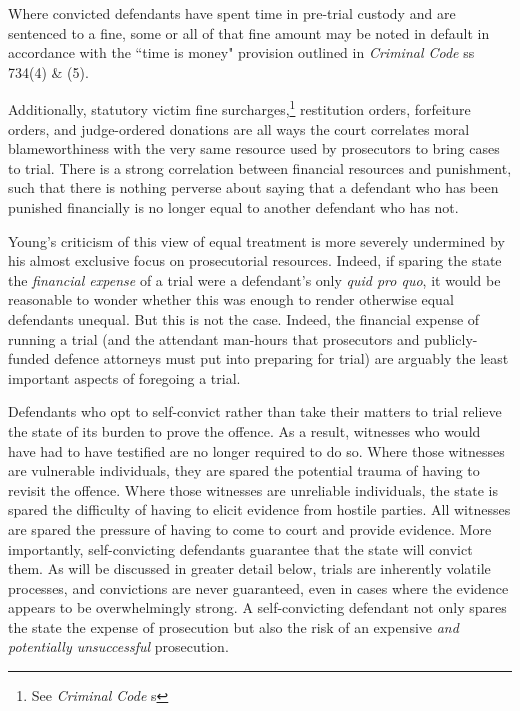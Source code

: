 Where convicted defendants have spent time in pre-trial custody and are sentenced to a fine, some or all of that fine amount may be noted in default in accordance with the ``time is money" provision outlined in \textit{Criminal Code} ss 734(4) \& (5).

Additionally, statutory victim fine surcharges,\footnote{See \textit{Criminal Code} s } restitution orders, forfeiture orders, and judge-ordered donations are all ways the court correlates moral blameworthiness with the very same resource used by prosecutors to bring cases to trial. There is a strong correlation between financial resources and punishment, such that there is nothing perverse about saying that a defendant who has been punished financially is no longer equal to another defendant who has not.

Young's criticism of this view of equal treatment is more severely undermined by his almost exclusive focus on prosecutorial resources. Indeed, if sparing the state the \textit{financial expense} of a trial were a defendant's only \textit{quid pro quo}, it would be reasonable to wonder whether this was enough to render otherwise equal defendants unequal. But this is not the case. Indeed, the financial expense of running a trial (and the attendant man-hours that prosecutors and publicly-funded defence attorneys must put into preparing for trial) are arguably the least important aspects of foregoing a trial. 

Defendants who opt to self-convict rather than take their matters to trial relieve the state of its burden to prove the offence. As a result, witnesses who would have had to have testified are no longer required to do so. Where those witnesses are vulnerable individuals, they are spared the potential trauma of having to revisit the offence. Where those witnesses are unreliable individuals, the state is spared the difficulty of having to elicit evidence from hostile parties. All witnesses are spared the pressure of having to come to court and provide evidence. More importantly, self-convicting defendants guarantee that the state will convict them. As will be discussed in greater detail below, trials are inherently volatile processes, and convictions are never guaranteed, even in cases where the evidence appears to be overwhelmingly strong. A self-convicting defendant not only spares the state the expense of prosecution but also the risk of an expensive \textit{and potentially unsuccessful} prosecution.

